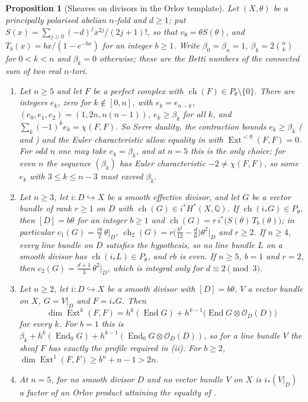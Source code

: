 \documentclass[11pt,reqno]{amsart}
\theoremstyle{plain}
\newtheorem{proposition}[theorem]{Proposition}
\theoremstyle{definition}
\theoremstyle{remark}
\newcommand{\QQ}{\mathbb{Q}}
\newcommand{\cO}{\mathcal{O}}
\DeclareMathOperator{\ch}{ch}
\DeclareMathOperator{\End}{End}
\DeclareMathOperator{\Ext}{Ext}
\begin{document}
\begin{proposition}[Sheaves on divisors in the Orlov template]
\label{prop:divisortemplate}
Let $(X,\theta)$ be a principally polarised abelian $n$-fold and $d\ge1$; put
$S(x)=\sum_{j\ge0}(-d)^{j}x^{2j}/(2j+1)!$, so that $v_{\theta}=\theta
S(\theta)$, and $T_{b}(x)=bx/(1-e^{-bx})$ for an integer $b\ge1$. Write
$\beta_{0}=\beta_{n}=1$, $\beta_{k}=2\binom{n}{k}$ for $0<k<n$ and
$\beta_{k}=0$ otherwise; these are the Betti numbers of the connected sum of
two real $n$-tori.
\begin{enumerate}[label=\textup{(\roman*)},leftmargin=2.6em,itemsep=2pt]
\item Let $n\ge5$ and let $F$ be a perfect complex with
  $\ch(F)\in P_{\theta}\setminus\{0\}$. There are integers $e_{k}$, zero for
  $k\notin[0,n]$, with $e_{k}=e_{n-k}$, $(e_{0},e_{1},e_{2})=(1,2n,n(n-1))$,
  $e_{k}\ge\beta_{k}$ for all $k$, and $\sum_{k}(-1)^{k}e_{k}=\chi(F,F)$. So
  Serre duality, the contraction bounds $e_{k}\ge\beta_{k}$
  ( and \cite{CRV12}) and the Euler
  characteristic allow equality in  with
  $\Ext^{<0}(F,F)=0$. For odd $n$ one may take $e_{k}=\beta_{k}$, and at $n=5$
  this is the only choice; for even $n$ the sequence $(\beta_{k})$ has Euler
  characteristic $-2\ne\chi(F,F)$, so some $e_{k}$ with $3\le k\le n-3$ must
  exceed $\beta_{k}$.
\item Let $n\ge3$, let $i\colon D\hookrightarrow X$ be a smooth effective
  divisor, and let $G$ be a vector bundle of rank $r\ge1$ on $D$ with
  $\ch(G)\in i^{*}H^{*}(X,\QQ)$. If $\ch(i_{*}G)\in P_{\theta}$, then
  $[D]=b\theta$ for an integer $b\ge1$ and
  $\ch(G)=r\,i^{*}\bigl(S(\theta)\,T_{b}(\theta)\bigr)$; in particular
  $c_{1}(G)=\frac{rb}{2}\,\theta|_{D}$,
  $\ch_{2}(G)=r\bigl(\frac{b^{2}}{12}-\frac{d}{6}\bigr)\theta^{2}|_{D}$ and
  $r\ge2$. If $n\ge4$, every line bundle on $D$ satisfies the hypothesis, so
  no line bundle $L$ on a smooth divisor has $\ch(i_{*}L)\in P_{\theta}$, and
  $rb$ is even. If $n\ge5$, $b=1$ and $r=2$, then
  $c_{2}(G)=\frac{d+1}{3}\,\theta^{2}|_{D}$, which is integral only for
  $d\equiv2\pmod3$.
\item Let $n\ge2$, let $i\colon D\hookrightarrow X$ be a smooth divisor with
  $[D]=b\theta$, $V$ a vector bundle on $X$, $G=V|_{D}$ and $F=i_{*}G$. Then
  \[
    \dim\Ext^{k}(F,F)=h^{k}(\End G)+h^{k-1}\bigl(\End G\otimes\cO_{D}(D)\bigr)
  \]
  for every $k$. For $b=1$ this is
  $\beta_{k}+h^{k}(\End_{0}G)+h^{k-1}(\End_{0}G\otimes\cO_{D}(D))$, so for a line
  bundle $V$ the sheaf $F$ has exactly the profile required in
  (ii). For $b\ge2$, $\dim\Ext^{1}(F,F)\ge
  b^{n}+n-1>2n$.
\item At $n=5$, for no smooth divisor $D$ and no vector bundle $V$ on $X$ is
  $i_{*}(V|_{D})$ a factor of an Orlov product attaining the equality of
  .
\end{enumerate}
\end{proposition}
\end{document}
